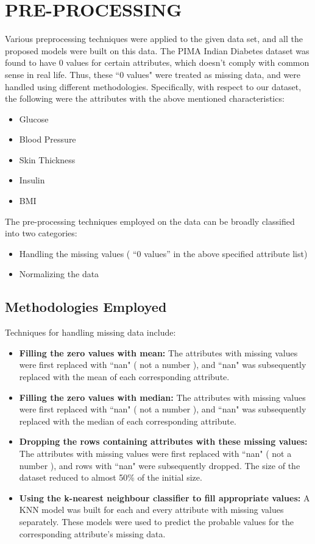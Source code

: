 
\chapter{PRE-PROCESSING} 
Various preprocessing techniques were applied to the given data set, and all the proposed models were built on this data. The PIMA Indian Diabetes dataset was found to have 0 values for certain attributes, which doesn't comply with common sense in real life. Thus, these ``0 values" were treated as missing data, and were handled using different methodologies. Specifically, with respect to our dataset, the following were the attributes with the above mentioned characteristics:
\begin{itemize}
    \item Glucose
    \item Blood Pressure
    \item Skin Thickness
    \item Insulin
    \item BMI
\end{itemize}

The pre-processing techniques employed on the data can be broadly classified into two categories:
\begin{itemize}
    \item Handling the missing values ( “0 values” in the above specified attribute list)
    \item Normalizing the data

\end{itemize}

\section{Methodologies Employed}
Techniques for handling missing data  include:
\begin{itemize}
    \item \textbf{Filling the zero values with mean:}
The attributes with missing values were first replaced with ``nan" ( not a number ), and ``nan" was subsequently replaced with the mean of each corresponding attribute.
    \item\textbf{Filling the zero values with median:}
The attributes with missing values were first replaced with ``nan" ( not a number ), and ``nan" was subsequently replaced with the median of each corresponding attribute.

\item \textbf{Dropping the rows containing attributes with these missing values:}
The attributes with missing values were first replaced with ``nan" ( not a number ), and rows with ``nan" were subsequently dropped. The size of the dataset reduced to almost 50\% of the initial size.

\item \textbf{Using the k-nearest neighbour classifier to fill appropriate values:}
A KNN model was built for each and every attribute with missing values separately. These models were used to predict the probable values for the corresponding attribute's missing data.
\end{itemize}

